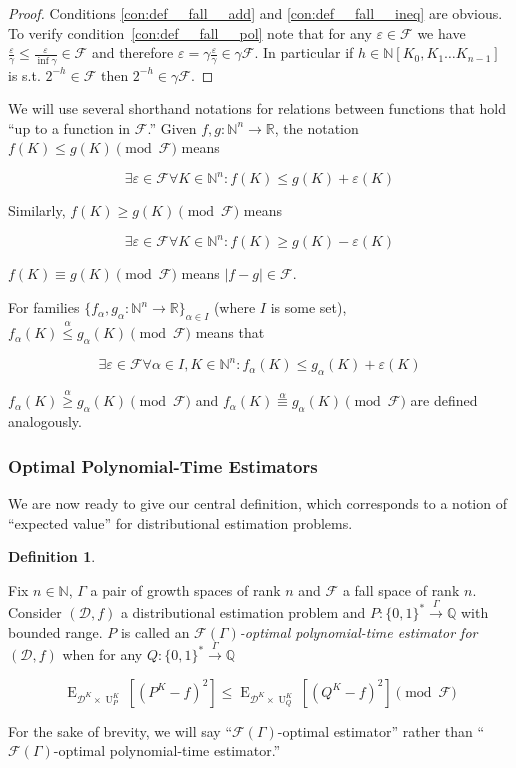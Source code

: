 \documentclass{article}
\numberwithin{equation}{section}
\theoremstyle{definition}
\newtheorem{definition}{Definition}[section]
\theoremstyle{plain}
\newcommand{\Bool}{\{0,1\}}
\newcommand{\Words}{{\Bool^*}}
\DeclareMathOperator{\E}{E}
\DeclareMathOperator{\Un}{U}
\newcommand{\Nats}{\mathbb{N}}
\newcommand{\Rats}{\mathbb{Q}}
\newcommand{\Reals}{\mathbb{R}}
\newcommand{\NatPoly}{\Nats[K_0, K_1 \ldots K_{n-1}]}
\newcommand{\NatFun}{\Nats^n \rightarrow}
\newcommand{\Abs}[1]{\lvert #1 \rvert}
\newcommand{\Dist}{\mathcal{D}}
\newcommand{\Fall}{\mathcal{F}}
\newcommand{\EG}{\Fall(\Gamma)}
\newcommand{\Scheme}{\xrightarrow{\Gamma}}
\begin{document}
\begin{proof}

Conditions \ref{con:def__fall__add} and \ref{con:def__fall__ineq} are obvious. To verify condition~\ref{con:def__fall__pol} note that for any $\varepsilon \in \Fall$ we have ${\frac{\varepsilon}{\gamma} \leq \frac{\varepsilon}{\inf \gamma} \in \Fall}$ and therefore $\varepsilon = \gamma \frac{\varepsilon}{\gamma} \in \gamma \Fall$. In particular if $h \in \NatPoly$ is s.t. $2^{-h} \in \Fall$ then $2^{-h} \in \gamma \Fall$.
%
\end{proof}

We will use several shorthand notations for relations between functions that hold \enquote{up to a function in ${\Fall}$.} Given $f,g: \NatFun \Reals$, the notation ${f(K) \leq g(K) \pmod \Fall}$ means 

\[\exists \varepsilon \in \Fall \forall K \in \Nats^n: f(K) \leq g(K) + \varepsilon(K)\]

Similarly, $f(K) \geq g(K) \pmod \Fall$ means 

\[\exists \varepsilon \in \Fall \forall K \in \Nats^n: f(K) \geq g(K) - \varepsilon(K)\]

$f(K) \equiv g(K) \pmod \Fall$ means $\Abs{f-g} \in \Fall$.

For families ${\{f_\alpha,g_\alpha: \NatFun \Reals\}_{\alpha \in I}}$ (where ${I}$ is some set), ${f_\alpha(K) \overset{\alpha}{\leq} g_\alpha(K) \pmod \Fall}$ means that 

\[\exists \varepsilon \in \Fall \forall \alpha \in I, K \in \Nats^n: f_\alpha(K) \leq g_\alpha(K) + \varepsilon(K)\]

${f_\alpha(K) \overset{\alpha}{\geq} g_\alpha(K) \pmod \Fall}$ and ${f_\alpha(K) \overset{\alpha}{\equiv} g_\alpha(K) \pmod \Fall}$ are defined analogously.

\subsubsection{Optimal Polynomial-Time Estimators}

We are now ready to give our central definition, which corresponds to a notion of \enquote{expected value} for distributional estimation problems.

\begin{definition}
\label{def:op}

Fix $n \in \Nats$, $\Gamma$ a pair of growth spaces of rank $n$ and $\Fall$ a fall space of rank $n$. Consider $(\Dist,f)$ a distributional estimation problem and $P: \Words \Scheme \Rats$ with bounded range. $P$ is called an \emph{$\EG$-optimal polynomial-time estimator for $(\Dist,f)$} when for any $Q: \Words \Scheme \Rats$

\begin{equation}
\label{eqn:op}
\E_{\Dist^{K} \times \Un_P^K}[(P^K - f)^2] \leq \E_{\Dist^{K} \times \Un_Q^K}[(Q^K - f)^2] \pmod \Fall
\end{equation}

For the sake of brevity, we will say \enquote{${\EG}$-optimal estimator} rather than \enquote{${\EG}$-optimal polynomial-time estimator.}

\end{definition}
\end{document}
